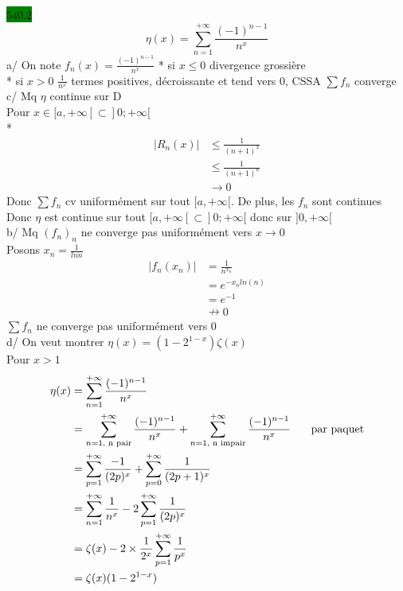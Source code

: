 \documentclass{article}
\begin{document}
\noindent \colorbox{green}{540.2}\\
\begin{equation*}
    \eta(x) = \sum_{n=1}^{+\infty}\frac{(-1)^{n-1}}{n^x}
\end{equation*}
a/ On note \(f_n(x) = \frac{(-1)^{n-1}}{n^x}\)
* si \(x \leq 0\) divergence grossière\\
* si \(x > 0\) \(\frac{1}{n^x}\) termes positives, décroissante et tend vers 0, CSSA \(\sum f_n\) converge
c/ Mq \(\eta\) continue sur D\\
Pour \(x \in [a,+\infty[ \subset] 0 ; +\infty [\)\\
* \begin{align*}
    |R_n(x)| &\leq \frac{1}{(n+1)^x}\\
    &\leq \frac{1}{(n+1)^a}\\
    &\rightarrow 0
\end{align*}
Donc \(\sum f_n\) cv uniformément sur tout \([a, +\infty[\). De 
plus, les \(f_n\) sont continues\\
Donc \(\eta\) est continue sur tout \([a, +\infty[\subset] 0 ; +\infty[\)
donc sur \(]0, +\infty[\)\\
b/ Mq \((f_n)_n\) ne converge pas uniformément vers \(x \to 0\)\\
Posons \(x_n = \frac{1}{lnn}\)\begin{align*}
    |f_n(x_n)| &= \frac{1}{n^{x_n}}\\
    &= e^{-x_n ln(n)}\\
    &= e^{-1}\\
    &\nrightarrow 0
\end{align*}
\(\sum f_n\) ne converge pas uniformément vers 0\\
d/ On veut montrer \(\eta(x) = (1-2^{1-x})\zeta(x)\)\\
Pour \(x > 1\)\begin{align*}
    \eta(x) &= \sum_{n=1}^{+\infty} \frac{(-1)^{n-1}}{n^x}\\
    &= \sum_{n=1, \text{ n pair}}^{+\infty} \frac{(-1)^{n-1}}{n^x} + \sum_{n=1, \text{ n impair}}^{+\infty} \frac{(-1)^{n-1}}{n^x} \indent \text{ par paquet}\\
    &= \sum_{p=1}^{+\infty} \frac{-1}{(2p)^x} + \sum_{p=0}^{+\infty} \frac{1}{(2p+1)^x}\\
    &= \sum_{n=1}^{+\infty} \frac{1}{n^x} - 2\sum_{p=1}^{+\infty} \frac{1}{(2p)^x}\\
    &= \zeta(x) - 2\times \frac{1}{2^x}\sum_{p=1}^{+\infty} \frac{1}{p^x}\\
    &= \zeta(x)(1-2^{1-x}) 
\end{align*}
\end{document}
